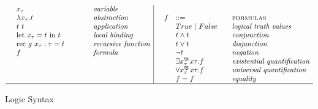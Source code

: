 \begin{figure}[H]
\begin{adjustwidth}{-7em}{-3em}
\begin{displaymath}
\begin{array}{ll@{\hspace*{-0.1cm}}
							 l@{\hspace*{1.5cm} }
							 l|@{\hspace*{0.5cm}}
							 llll}
	& \lgvar{x}{\tau}
	& & \textit{variable}
	
	& \ \\


	
	& \lgabs{x}{\tau}{t}
	& & \textit{abstraction}  &

  f & ::= 
	& & \textsc{formulas} \\

	
	
	& \lgapp{t}{t}
	& & \textit{application} &
	
	& True ~|~ False 
	& & \textit{logical truth values} \\
	
	
	
	& \lglet{x}{\tau}{t}{t}
	& & \textit{local binding} &
	
	& \lgand{t}{t} 
	& & \textit{conjunction}\\
	
	
	
	& \lgrec{g}{\tau}{x}{\tau}{t}
	& & \textit{recursive function} &
	
	& \lgor{t}{t} 
	& & \textit{disjunction} \\
	
		
		
	& f
	& & \textit{formula} &
	
	& \neg t
	& & \textit{negation} \\		



	& \ 
	& & \ &
	
	&  \lgexist{x}{\tau}{f} 
	& & \textit{existential quantification} \\ 



	& \ 
	& & \ &
	
	&  \lgforall{x}{\tau}{f} 
	& & \textit{universal quantification} \\ 
	
	
	
	& \ 
	& & \ &
	
	&  f = f
	& & \textit{equality} \\ 

	\hline			   
  	\end{array} 
		\end{displaymath} 
 		\caption{Logic Syntax}
 		\end{adjustwidth}
	\end{figure}
	
\newpage
\newcommand{\paragraphred}[1]{\paragraph{\textcolor{red}{#1}}}
